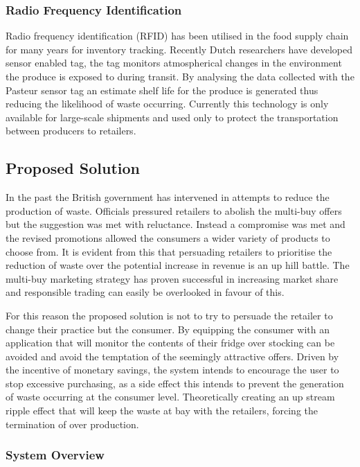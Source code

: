 \documentclass[a4paper, 11pt]{article}
\begin{document}
\subsubsection{Radio Frequency Identification} 
Radio frequency identification (RFID) has been utilised in the food supply chain for many years for inventory tracking. Recently Dutch researchers have developed sensor enabled tag, the tag monitors atmospherical changes in the environment the produce is exposed to during transit. By analysing the data collected with the Pasteur sensor tag an estimate shelf life for the produce is generated thus reducing the likelihood of waste occurring. Currently this technology is only available for large-scale shipments and used only to protect the transportation between producers to retailers. 

\subsection{Proposed Solution}
In the past the British government has intervened in attempts to reduce the production of waste. Officials pressured retailers to abolish the multi-buy offers but the suggestion was met with reluctance. Instead a compromise was met and the revised promotions allowed the consumers a wider variety of products to choose from. It is evident from this that persuading retailers to prioritise the reduction of waste over the potential increase in revenue is an up hill battle. The multi-buy marketing strategy has proven successful in increasing market share and responsible trading can easily be overlooked in favour of this.

For this reason the proposed solution is not to try to persuade the retailer to change their practice but the consumer. By equipping the consumer with an application that will monitor the contents of their fridge over stocking can be avoided and avoid the temptation of the seemingly attractive offers. Driven by the incentive of monetary savings, the system intends to encourage the user to stop excessive purchasing, as a side effect this intends to prevent the generation of waste occurring at the consumer level. Theoretically creating an up stream ripple effect that will keep the waste at bay with the retailers, forcing the termination of over production. 

\subsubsection{System Overview}
\end{document}
